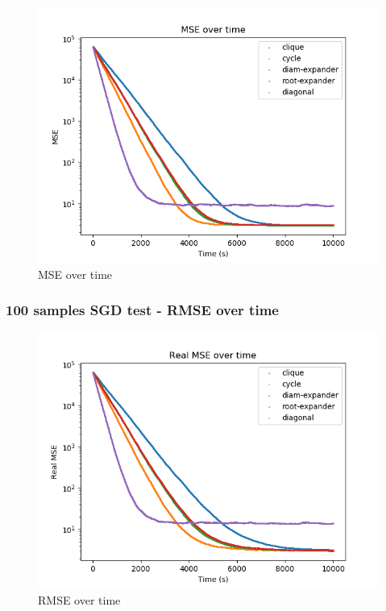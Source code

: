 \documentclass[11pt]{article}
\makeatletter
\def\maxwidth{\ifdim\Gin@nat@width>\linewidth\linewidth
    \else\Gin@nat@width\fi}
\let\Oldincludegraphics\includegraphics
\renewcommand{\includegraphics}[1]{\Oldincludegraphics[width=.8\maxwidth]{#1}}
\makeatother
\begin{document}
\begin{figure}
\centering
\includegraphics{media/img/tests/test_003_100samples_stochastic/3_mse_time.png}
\caption{MSE over time}
\end{figure}

\subsubsection{100 samples SGD test - RMSE over
time}\label{samples-sgd-test---rmse-over-time}

\begin{figure}
\centering
\includegraphics{media/img/tests/test_003_100samples_stochastic/3_real-mse_time.png}
\caption{RMSE over time}
\end{figure}
\end{document}
